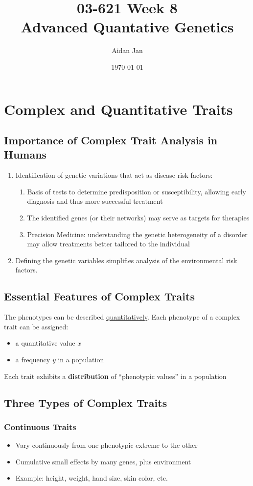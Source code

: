 \documentclass[10pt]{article}
\title{03-621 Week 8 \\ \large{Advanced Quantative Genetics}}
\author{Aidan Jan}
\date{\today}
\begin{document}
\maketitle

\section*{Complex and Quantitative Traits}
\subsection*{Importance of Complex Trait Analysis in Humans}
\begin{enumerate}
	\item Identification of genetic variations that act as disease risk factors:
    \begin{enumerate}
	    \item Basis of tests to determine predisposition or susceptibility, allowing early diagnosis and thus more successful treatment
	    \item The identified genes (or their networks) may serve as targets for therapies
	    \item Precision Medicine: understanding the genetic heterogeneity of a disorder may allow treatments better tailored to the individual
    \end{enumerate}
    \item Defining the genetic variables simplifies analysis of the environmental risk factors.
\end{enumerate}

\subsection*{Essential Features of Complex Traits}
The phenotypes can be described \underline{quantitatively}.  Each phenotype of a complex trait can be assigned:
\begin{itemize}
	\item a quantitative value $x$
	\item a frequency $y$ in a population
\end{itemize}
Each trait exhibits a \textbf{distribution} of ``phenotypic values'' in a population

\subsection*{Three Types of Complex Traits}
\subsubsection*{Continuous Traits}
\begin{itemize}
	\item Vary continuously from one phenotypic extreme to the other
	\item Cumulative small effects by many genes, plus environment
	\item Example: height, weight, hand size, skin color, etc.
\end{itemize}
\end{document}
